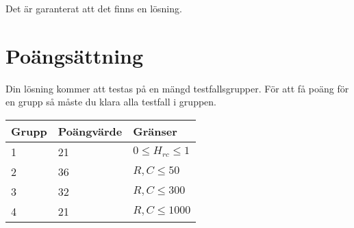 Det är garanterat att det finns en lösning.

\section*{Poängsättning}
Din lösning kommer att testas på en mängd testfallsgrupper. För att få poäng för en grupp så måste du klara alla testfall i gruppen.

\begin{tabular}{|l|l|l|}
\hline
Grupp & Poängvärde & Gränser \\ \hline
 1     & 21         &  $0 \leq H_{rc} \leq 1$ \\ \hline
 2     & 36         &  $R,C \leq 50$ \\ \hline
 3     & 32         &  $R,C \leq 300$ \\ \hline
 4     & 21         &  $R,C \leq 1000$ \\ \hline
\end{tabular}
